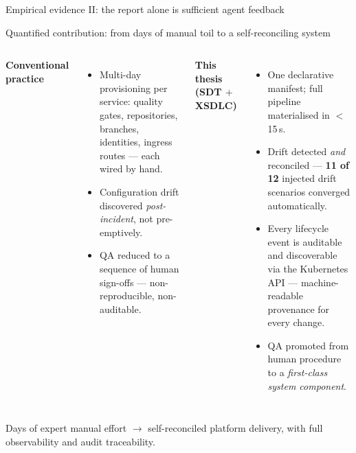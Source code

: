 \documentclass[11pt,aspectratio=169]{beamer}
\begin{document}
\begin{frame}{Empirical evidence II: the report alone is sufficient agent feedback}
\end{frame}

\begin{frame}{Quantified contribution: from days of manual toil to a self-reconciling system}

\begin{columns}[T,onlytextwidth]

\textbf{\textcolor{sdtred}{Conventional practice}}\\[0.4em]
\footnotesize
\begin{itemize}\setlength\itemsep{0.25em}
\item Multi-day provisioning per service: quality gates, repositories, branches, identities, ingress routes --- each wired by hand.
\item Configuration drift discovered \emph{post-incident}, not pre-emptively.
\item QA reduced to a sequence of human sign-offs --- non-reproducible, non-auditable.
\end{itemize}

\textbf{\textcolor{sdtgreen}{This thesis (SDT $+$ XSDLC)}}\\[0.4em]
\footnotesize
\begin{itemize}\setlength\itemsep{0.25em}
\item One declarative manifest; full pipeline materialised in $<$15\,s.
\item \alert{Drift detected \emph{and} reconciled} ---
  \textbf{11 of 12} injected drift scenarios converged automatically.
\item Every lifecycle event is \alert{auditable and discoverable} via the Kubernetes API --- machine-readable provenance for every change.
\item QA promoted from human procedure to a \emph{first-class system component}.
\end{itemize}

\end{columns}

\vspace{0.4em}
\begin{center}
\footnotesize
\alert{Days of expert manual effort $\to$ self-reconciled platform delivery,
with full observability and audit traceability.}
\end{center}

\end{frame}
\end{document}
